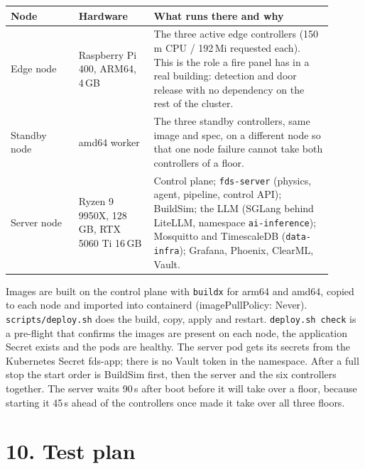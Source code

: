 \documentclass[11pt]{article}
\begin{document}
\begin{center}\begin{tabular}{@{}
  >{\raggedright\arraybackslash}p{0.19\linewidth}
  >{\raggedright\arraybackslash}p{0.21\linewidth}
  >{\raggedright\arraybackslash}p{0.50\linewidth}@{}}
\toprule
\textbf{Node} & \textbf{Hardware} & \textbf{What runs there and why} \\
\midrule

Edge node & Raspberry Pi 400, ARM64, 4\,GB & The three active edge 
controllers (150\,m CPU / 192\,Mi requested each). This is the role a fire panel has in a real 
building: detection and door release with no dependency on the rest of the cluster. \\
Standby node & amd64 worker & The three standby controllers, same image and 
spec, on a different node so that one node failure cannot take both controllers of a floor. \\
Server node & Ryzen 9 9950X, 128\,GB, RTX 5060 Ti 16\,GB & 
Control plane; \texttt{fds-server} (physics, agent, pipeline, control API); BuildSim; the 
LLM (SGLang behind LiteLLM, namespace \texttt{ai-inference}); Mosquitto and 
TimescaleDB (\texttt{data-infra}); Grafana, Phoenix, ClearML, Vault. \\
\bottomrule
\end{tabular}\end{center}

Images are built on the control plane with \texttt{buildx} for arm64 and amd64, copied to each 
node and imported into containerd (imagePullPolicy: Never). \texttt{scripts/deploy.sh} 
does the build, copy, apply and restart. \texttt{deploy.sh check} is a pre-flight that confirms 
the images are present on each node, the application Secret exists and the pods are healthy. 
The server pod gets its secrets from the Kubernetes Secret fds-app; there is no Vault token 
in the namespace. After a full stop the start order is BuildSim first, then the server and the 
six controllers together. The server waits 90\,s after boot before it will take over a floor, 
because starting it 45\,s ahead of the controllers once made it take over all three floors.


\section{10. Test plan}
\end{document}

